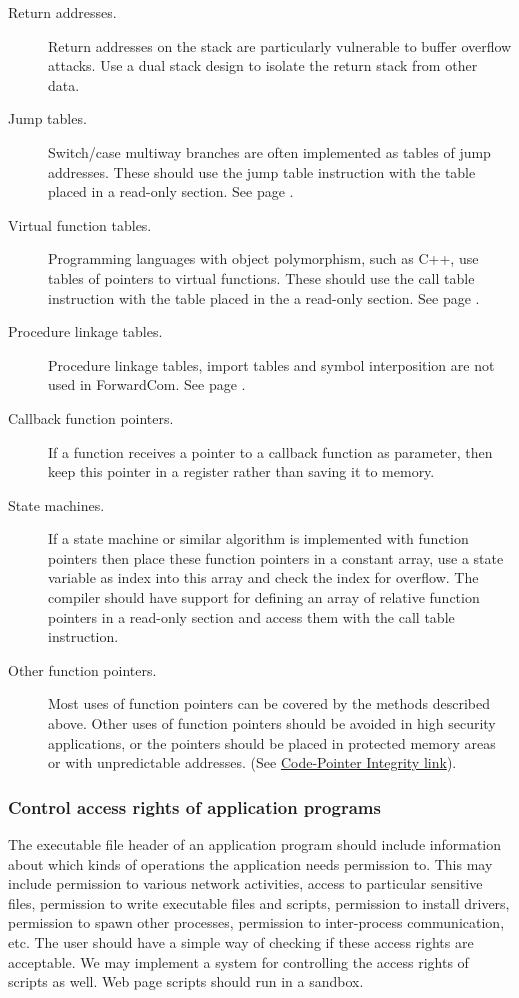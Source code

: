 \documentclass[forwardcom.tex]{subfiles}
\begin{document}
\begin{description}
\item[Return addresses.] Return addresses on the stack are particularly vulnerable to buffer overflow attacks. Use a dual stack design to isolate the return stack from other data.

\item[Jump tables.] Switch/case multiway branches are often implemented as tables of jump addresses. These should use the jump table instruction with the table placed in a read-only section. See page \pageref{jumpTableInstruction}.

\item[Virtual function tables.] Programming languages with object polymorphism, such as C++, use tables of pointers to virtual functions. These should use the call table instruction with the table placed in the a read-only section. See page \pageref{jumpTableInstruction}.

\item[Procedure linkage tables.] Procedure linkage tables, import tables and symbol interposition are not used in ForwardCom. See page \pageref{libraryLinkMethods}.

\item[Callback function pointers.] If a function receives a pointer to a callback function as parameter, then keep this pointer in a register rather than saving it to memory.

\item[State machines.] If a state machine or similar algorithm is implemented with function pointers then place these function pointers in a constant array, use a state variable as index into this array and check the index for overflow. The compiler should have support for defining an array of relative function pointers in a read-only section and access them with the call table instruction.

\item[Other function pointers.] Most uses of function pointers can be covered by the methods described above. Other uses of function pointers should be avoided in high security applications, or the pointers should be placed in protected memory areas or with unpredictable addresses. (See
\href{http://dslab.epfl.ch/proj/cpi/}{Code-Pointer Integrity link}).

\end{description}

\subsubsection{Control access rights of application programs} 
The executable file header of an application program should include information about which kinds of operations the application needs permission to. This may include permission to various network activities, access to particular sensitive files, permission to write executable files and scripts, permission to install drivers, permission to spawn other processes, permission to inter-process communication, etc. The user should have a simple way of checking if these access rights are acceptable. We may implement a system for controlling the access rights of scripts as well. Web page scripts should run in a sandbox.
\end{document}
